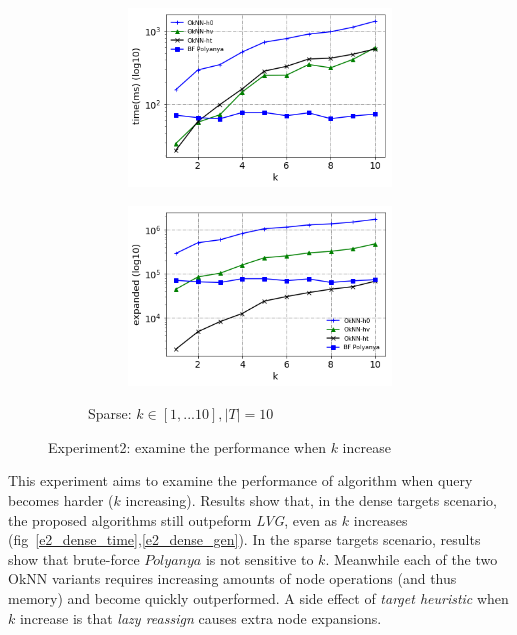 \begin{figure}[!htb]
\begin{subfigure}{\linewidth}
\begin{subfigure}{0.5\textwidth}
        \includegraphics[width=.9\textwidth]{pic/e2_sparse_time.png}
        \caption{}
        \label{e2_sparse_time}
    \end{subfigure}%
    \hfill
    \begin{subfigure}{0.5\textwidth}
        \centering
        \includegraphics[width=.9\textwidth]{pic/e2_sparse_gen.png}
        \caption{}
        \label{e2_sparse_gen}
    \end{subfigure}
    \caption*{Sparse: $k \in [1,...10], |T|=10$}
  \end{subfigure}
  \caption{\small Experiment2: examine the performance when $k$ increase}
\end{figure}
%
This experiment aims to examine the performance of algorithm when query becomes harder ($k$ increasing).
Results show that, in the dense targets scenario, the proposed algorithms still outpeform \textit{LVG}, even as $k$ increases (fig~\ref{e2_dense_time},\ref{e2_dense_gen}).
In the sparse targets scenario, results show that brute-force $Polyanya$ is not sensitive to $k$.
Meanwhile each of the two OkNN variants requires increasing amounts of node operations (and thus memory) and become quickly outperformed.
A side effect of \textit{target heuristic} when $k$ increase is that \textit{lazy reassign} causes extra node expansions.

